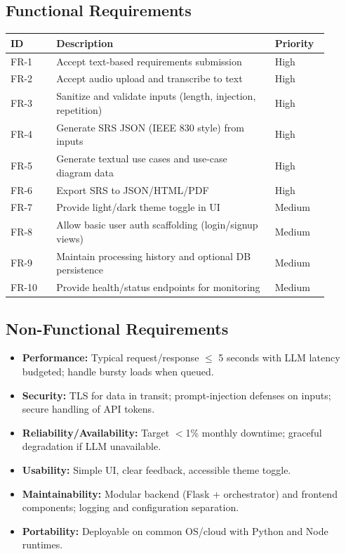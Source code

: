 \documentclass[11pt]{article}
\begin{document}
\subsection{Functional Requirements}
\begin{longtable}{p{0.13\linewidth} p{0.62\linewidth} p{0.15\linewidth}}
\toprule
\textbf{ID} & \textbf{Description} & \textbf{Priority} \\
\midrule
FR-1 & Accept text-based requirements submission & High \\
FR-2 & Accept audio upload and transcribe to text & High \\
FR-3 & Sanitize and validate inputs (length, injection, repetition) & High \\
FR-4 & Generate SRS JSON (IEEE 830 style) from inputs & High \\
FR-5 & Generate textual use cases and use-case diagram data & High \\
FR-6 & Export SRS to JSON/HTML/PDF & High \\
FR-7 & Provide light/dark theme toggle in UI & Medium \\
FR-8 & Allow basic user auth scaffolding (login/signup views) & Medium \\
FR-9 & Maintain processing history and optional DB persistence & Medium \\
FR-10 & Provide health/status endpoints for monitoring & Medium \\
\bottomrule
\end{longtable}

\subsection{Non-Functional Requirements}
\begin{itemize}
  \item \textbf{Performance:} Typical request/response $\leq$ 5 seconds with LLM latency budgeted; handle bursty loads when queued.
  \item \textbf{Security:} TLS for data in transit; prompt-injection defenses on inputs; secure handling of API tokens.
  \item \textbf{Reliability/Availability:} Target $<$1\% monthly downtime; graceful degradation if LLM unavailable.
  \item \textbf{Usability:} Simple UI, clear feedback, accessible theme toggle.
  \item \textbf{Maintainability:} Modular backend (Flask + orchestrator) and frontend components; logging and configuration separation.
  \item \textbf{Portability:} Deployable on common OS/cloud with Python and Node runtimes.
\end{itemize}
\end{document}

